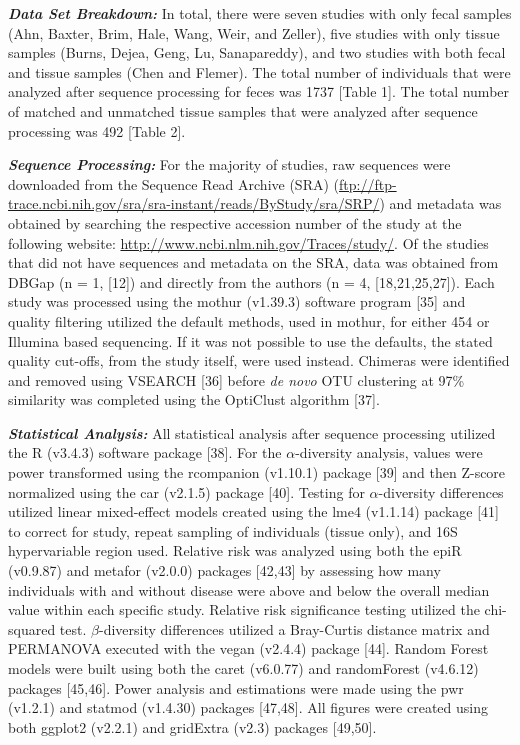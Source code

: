 \documentclass[12pt,]{article}
\begin{document}
\textbf{\emph{Data Set Breakdown:}} In total, there were seven studies
with only fecal samples (Ahn, Baxter, Brim, Hale, Wang, Weir, and
Zeller), five studies with only tissue samples (Burns, Dejea, Geng, Lu,
Sanapareddy), and two studies with both fecal and tissue samples (Chen
and Flemer). The total number of individuals that were analyzed after
sequence processing for feces was 1737 {[}Table 1{]}. The total number
of matched and unmatched tissue samples that were analyzed after
sequence processing was 492 {[}Table 2{]}.

\textbf{\emph{Sequence Processing:}} For the majority of studies, raw
sequences were downloaded from the Sequence Read Archive (SRA)
(\url{ftp://ftp-trace.ncbi.nih.gov/sra/sra-instant/reads/ByStudy/sra/SRP/})
and metadata was obtained by searching the respective accession number
of the study at the following website:
\url{http://www.ncbi.nlm.nih.gov/Traces/study/}. Of the studies that did
not have sequences and metadata on the SRA, data was obtained from DBGap
(n = 1, {[}12{]}) and directly from the authors (n = 4,
{[}18,21,25,27{]}). Each study was processed using the mothur (v1.39.3)
software program {[}35{]} and quality filtering utilized the default
methods, used in mothur, for either 454 or Illumina based sequencing. If
it was not possible to use the defaults, the stated quality cut-offs,
from the study itself, were used instead. Chimeras were identified and
removed using VSEARCH {[}36{]} before \emph{de novo} OTU clustering at
97\% similarity was completed using the OptiClust algorithm {[}37{]}.

\textbf{\emph{Statistical Analysis:}} All statistical analysis after
sequence processing utilized the R (v3.4.3) software package {[}38{]}.
For the \(\alpha\)-diversity analysis, values were power transformed
using the rcompanion (v1.10.1) package {[}39{]} and then Z-score
normalized using the car (v2.1.5) package {[}40{]}. Testing for
\(\alpha\)-diversity differences utilized linear mixed-effect models
created using the lme4 (v1.1.14) package {[}41{]} to correct for study,
repeat sampling of individuals (tissue only), and 16S hypervariable
region used. Relative risk was analyzed using both the epiR (v0.9.87)
and metafor (v2.0.0) packages {[}42,43{]} by assessing how many
individuals with and without disease were above and below the overall
median value within each specific study. Relative risk significance
testing utilized the chi-squared test. \(\beta\)-diversity differences
utilized a Bray-Curtis distance matrix and PERMANOVA executed with the
vegan (v2.4.4) package {[}44{]}. Random Forest models were built using
both the caret (v6.0.77) and randomForest (v4.6.12) packages
{[}45,46{]}. Power analysis and estimations were made using the pwr
(v1.2.1) and statmod (v1.4.30) packages {[}47,48{]}. All figures were
created using both ggplot2 (v2.2.1) and gridExtra (v2.3) packages
{[}49,50{]}.
\end{document}
